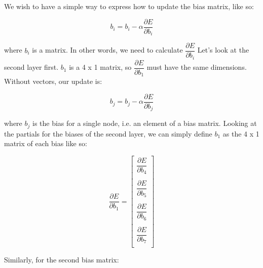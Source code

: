 \documentclass{article}
\begin{document}
We wish to have a simple way to express how to update the bias matrix, like so:

\[ b_i = b_i - \alpha\dfrac{\partial E}{\partial b_i}  \]

where $b_i$ is a matrix. In other words, we need to calculate $\dfrac{\partial E}{\partial b_i}$ Let's look at the second layer first. $b_1$ is a 4 x 1 matrix, so $\dfrac{\partial E}{\partial b_1}$ must have the same dimensions. Without vectors, our update is:

\[ b_j = b_j - \alpha\dfrac{\partial E}{\partial b_j}\]

where $b_j$ is the bias for a single node, i.e. an element of a bias matrix. Looking at the partials for the biases of the second layer, we can simply define $b_1$ as the 4 x 1 matrix of each bias like so:

\[
\dfrac{\partial E}{\partial b_1} =
\begin{bmatrix}
    \dfrac{\partial E}{\partial b_4} \\ \\
    \dfrac{\partial E}{\partial b_5} \\ \\
    \dfrac{\partial E}{\partial b_6} \\ \\
    \dfrac{\partial E}{\partial b_7} \\
\end{bmatrix}
\]

Similarly, for the second bias matrix:
\end{document}
